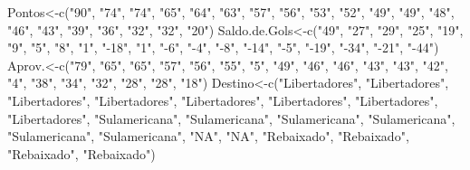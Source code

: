 \documentclass[
]{book}
\newenvironment{Shaded}{\begin{snugshade}}{\end{snugshade}}
\newcommand{\FunctionTok}[1]{\textcolor[rgb]{0.00,0.00,0.00}{#1}}
\newcommand{\NormalTok}[1]{#1}
\newcommand{\OtherTok}[1]{\textcolor[rgb]{0.56,0.35,0.01}{#1}}
\newcommand{\StringTok}[1]{\textcolor[rgb]{0.31,0.60,0.02}{#1}}
\begin{document}
\begin{Shaded}
\begin{Highlighting}[]
\NormalTok{Pontos}\OtherTok{\textless{}{-}}\FunctionTok{c}\NormalTok{(}\StringTok{"90"}\NormalTok{, }\StringTok{"74"}\NormalTok{,   }\StringTok{"74"}\NormalTok{,   }\StringTok{"65"}\NormalTok{,   }\StringTok{"64"}\NormalTok{,   }\StringTok{"63"}\NormalTok{,   }\StringTok{"57"}\NormalTok{,   }\StringTok{"56"}\NormalTok{,   }\StringTok{"53"}\NormalTok{,   }\StringTok{"52"}\NormalTok{,   }\StringTok{"49"}\NormalTok{,   }\StringTok{"49"}\NormalTok{,   }\StringTok{"48"}\NormalTok{,   }\StringTok{"46"}\NormalTok{,   }\StringTok{"43"}\NormalTok{,   }\StringTok{"39"}\NormalTok{,   }\StringTok{"36"}\NormalTok{,   }\StringTok{"32"}\NormalTok{,   }\StringTok{"32"}\NormalTok{,   }\StringTok{"20"}\NormalTok{)}
\NormalTok{Saldo.de.Gols}\OtherTok{\textless{}{-}}\FunctionTok{c}\NormalTok{(}\StringTok{"49"}\NormalTok{,  }\StringTok{"27"}\NormalTok{,   }\StringTok{"29"}\NormalTok{,   }\StringTok{"25"}\NormalTok{,   }\StringTok{"19"}\NormalTok{,   }\StringTok{"9"}\NormalTok{,    }\StringTok{"5"}\NormalTok{,    }\StringTok{"8"}\NormalTok{,    }\StringTok{"1"}\NormalTok{,    }\StringTok{"{-}18"}\NormalTok{,  }\StringTok{"1"}\NormalTok{,    }\StringTok{"{-}6"}\NormalTok{,   }\StringTok{"{-}4"}\NormalTok{,   }\StringTok{"{-}8"}\NormalTok{,   }\StringTok{"{-}14"}\NormalTok{,  }\StringTok{"{-}5"}\NormalTok{,   }\StringTok{"{-}19"}\NormalTok{,  }\StringTok{"{-}34"}\NormalTok{,  }\StringTok{"{-}21"}\NormalTok{,  }\StringTok{"{-}44"}\NormalTok{)}
\NormalTok{Aprov.}\OtherTok{\textless{}{-}}\FunctionTok{c}\NormalTok{(}\StringTok{"79"}\NormalTok{, }\StringTok{"65"}\NormalTok{,   }\StringTok{"65"}\NormalTok{,   }\StringTok{"57"}\NormalTok{,   }\StringTok{"56"}\NormalTok{,   }\StringTok{"55"}\NormalTok{,   }\StringTok{"5"}\NormalTok{,    }\StringTok{"49"}\NormalTok{,   }\StringTok{"46"}\NormalTok{,   }\StringTok{"46"}\NormalTok{,   }\StringTok{"43"}\NormalTok{,   }\StringTok{"43"}\NormalTok{,   }\StringTok{"42"}\NormalTok{,   }\StringTok{"4"}\NormalTok{,    }\StringTok{"38"}\NormalTok{,   }\StringTok{"34"}\NormalTok{,   }\StringTok{"32"}\NormalTok{,   }\StringTok{"28"}\NormalTok{,   }\StringTok{"28"}\NormalTok{,   }\StringTok{"18"}\NormalTok{)}
\NormalTok{Destino}\OtherTok{\textless{}{-}}\FunctionTok{c}\NormalTok{(}\StringTok{"Libertadores"}\NormalTok{,  }\StringTok{"Libertadores"}\NormalTok{, }\StringTok{"Libertadores"}\NormalTok{, }\StringTok{"Libertadores"}\NormalTok{, }\StringTok{"Libertadores"}\NormalTok{, }\StringTok{"Libertadores"}\NormalTok{, }\StringTok{"Libertadores"}\NormalTok{, }\StringTok{"Libertadores"}\NormalTok{, }\StringTok{"Sulamericana"}\NormalTok{, }\StringTok{"Sulamericana"}\NormalTok{, }\StringTok{"Sulamericana"}\NormalTok{, }\StringTok{"Sulamericana"}\NormalTok{, }\StringTok{"Sulamericana"}\NormalTok{, }\StringTok{"Sulamericana"}\NormalTok{, }\StringTok{"NA"}\NormalTok{,   }\StringTok{"NA"}\NormalTok{,   }\StringTok{"Rebaixado"}\NormalTok{,    }\StringTok{"Rebaixado"}\NormalTok{,    }\StringTok{"Rebaixado"}\NormalTok{,    }\StringTok{"Rebaixado"}\NormalTok{)}


\end{Highlighting}
\end{Shaded}
\end{document}
